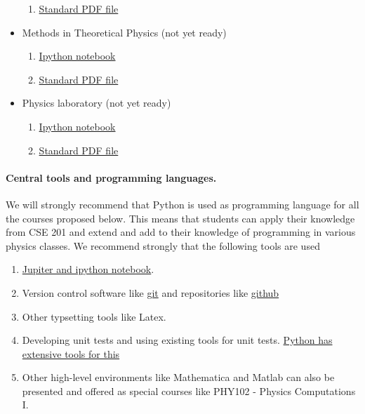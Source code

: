 \documentclass[%
oneside,                 %
final,                   %
10pt]{article}
\begin{document}
\begin{itemize}
\begin{enumerate}
  \item \href{{https://github.com/CompPhysics/PAComputationsMSU/tree/master/doc/pub/StatPhys/pdf/StatPhys-minted.pdf}}{Standard PDF file}

\end{enumerate}

\noindent
\item Methods in Theoretical Physics (not yet ready)
\begin{enumerate}

  \item \href{{https://github.com/CompPhysics/PAComputationsMSU/tree/master/doc/pub/}}{Ipython notebook}

  \item \href{{https://github.com/CompPhysics/PAComputationsMSU/tree/master/doc/pub/}}{Standard PDF file}

\end{enumerate}

\noindent
\item Physics laboratory (not yet ready)
\begin{enumerate}

  \item \href{{https://github.com/CompPhysics/PAComputationsMSU/tree/master/doc/pub/}}{Ipython notebook}

  \item \href{{https://github.com/CompPhysics/PAComputationsMSU/tree/master/doc/pub/}}{Standard PDF file}
\end{enumerate}

\noindent
\end{itemize}

\noindent
\paragraph{Central tools and programming languages.}
We will strongly recommend that Python is used as programming language for all the courses proposed below. This means that students can apply their knowledge from CSE 201 and extend and add to their knowledge of programming in various physics classes. We recommend strongly that the following tools are used
\begin{enumerate}
\item \href{{http://jupyter.org/}}{Jupiter and ipython notebook}. 

\item Version control software like \href{{https://git-scm.com/}}{git} and repositories like \href{{https://github.com/}}{github}

\item Other typsetting tools like Latex.

\item Developing unit tests and using existing tools for unit tests. \href{{https://docs.python.org/2/library/unittest.html}}{Python has extensive tools for this}

\item Other high-level environments like Mathematica and Matlab can also be presented and offered as special courses like PHY102 - Physics Computations I.  
\end{enumerate}
\end{document}

